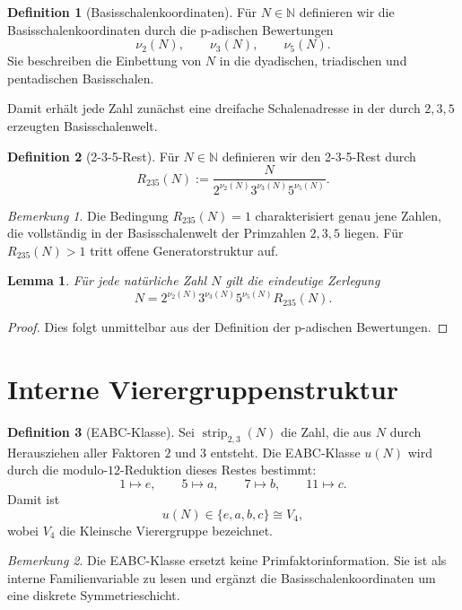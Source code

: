 \documentclass[11pt,a4paper]{article}
\theoremstyle{plain}
\newtheorem{lemma}{Lemma}
\theoremstyle{definition}
\newtheorem{definition}{Definition}
\theoremstyle{remark}
\newtheorem{bemerkung}{Bemerkung}
\begin{document}
\begin{definition}[Basisschalenkoordinaten]
Für \(N\in\mathbb{N}\) definieren wir die Basisschalenkoordinaten durch die p-adischen Bewertungen
\[
\nu_2(N),\qquad \nu_3(N),\qquad \nu_5(N).
\]
Sie beschreiben die Einbettung von \(N\) in die dyadischen, triadischen und pentadischen Basisschalen.
\end{definition}

Damit erhält jede Zahl zunächst eine dreifache Schalenadresse in der durch \(2,3,5\) erzeugten Basisschalenwelt.

\begin{definition}[2-3-5-Rest]
Für \(N\in\mathbb{N}\) definieren wir den 2-3-5-Rest durch
\[
R_{235}(N):=\frac{N}{2^{\nu_2(N)}3^{\nu_3(N)}5^{\nu_5(N)}}.
\]
\end{definition}

\begin{bemerkung}
Die Bedingung \(R_{235}(N)=1\) charakterisiert genau jene Zahlen, die vollständig in der Basisschalenwelt der Primzahlen \(2,3,5\) liegen. 
Für \(R_{235}(N)>1\) tritt offene Generatorstruktur auf.
\end{bemerkung}

\begin{lemma}
Für jede natürliche Zahl \(N\) gilt die eindeutige Zerlegung
\[
N=2^{\nu_2(N)}3^{\nu_3(N)}5^{\nu_5(N)}R_{235}(N).
\]
\end{lemma}

\begin{proof}
Dies folgt unmittelbar aus der Definition der p-adischen Bewertungen.
\end{proof}

\section{Interne Vierergruppenstruktur}

\begin{definition}[EABC-Klasse]
Sei \(\operatorname{strip}_{2,3}(N)\) die Zahl, die aus \(N\) durch Herausziehen aller Faktoren \(2\) und \(3\) entsteht. 
Die EABC-Klasse \(u(N)\) wird durch die modulo-\(12\)-Reduktion dieses Restes bestimmt:
\[
1\mapsto e,\qquad 5\mapsto a,\qquad 7\mapsto b,\qquad 11\mapsto c.
\]
Damit ist
\[
u(N)\in\{e,a,b,c\}\cong V_4,
\]
wobei \(V_4\) die Kleinsche Vierergruppe bezeichnet.
\end{definition}

\begin{bemerkung}
Die EABC-Klasse ersetzt keine Primfaktorinformation. 
Sie ist als interne Familienvariable zu lesen und ergänzt die Basisschalenkoordinaten um eine diskrete Symmetrieschicht.
\end{bemerkung}
\end{document}
